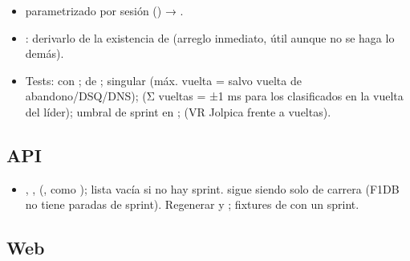 \begin{itemize}
\item {} parametrizado por sesión () → .
\item {}: derivarlo de la existencia de  (arreglo inmediato, útil aunque no se haga lo demás).
\item Tests:  con ;  de ; singular  (máx. vuelta =  salvo vuelta de abandono/DSQ/DNS);  (Σ vueltas =  ±1 ms para los clasificados en la vuelta del líder); umbral de sprint en ;  (VR Jolpica frente a vueltas).
\end{itemize}

\subsection{API}

\begin{itemize}
\item {}, ,  (, como ); lista vacía si no hay sprint.  sigue siendo solo de carrera (F1DB no tiene paradas de sprint). Regenerar  y ; fixtures de  con un sprint.
\end{itemize}

\subsection{Web}

